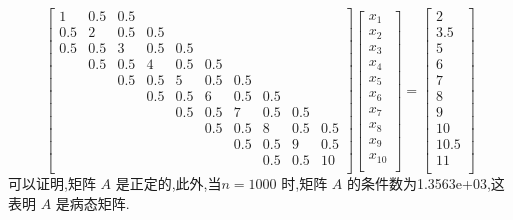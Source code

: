 \documentclass[a4paper]{article}
\numberwithin{equation}{section}
\begin{document}
\begin{equation}
    \begin{bmatrix}
        1   & 0.5 & 0.5 &     &     &     &     &     &     &     \\
        0.5 & 2   & 0.5 & 0.5 &     &     &     &     &     &     \\
        0.5 & 0.5 & 3   & 0.5 & 0.5 &     &     &     &     &     \\
            & 0.5 & 0.5 & 4   & 0.5 & 0.5 &     &     &     &     \\
            &     & 0.5 & 0.5 & 5   & 0.5 & 0.5 &     &     &     \\
            &     &     & 0.5 & 0.5 & 6   & 0.5 & 0.5 &     &     \\
            &     &     &     & 0.5 & 0.5 & 7   & 0.5 & 0.5 &     \\
            &     &     &     &     & 0.5 & 0.5 & 8   & 0.5 & 0.5 \\
            &     &     &     &     &     & 0.5 & 0.5 & 9   & 0.5 \\
            &     &     &     &     &     &     & 0.5 & 0.5 & 10  \\
    \end{bmatrix}
    \begin{bmatrix}
        x_1    \\
        x_2    \\
        x_3    \\
        x_4    \\
        x_5    \\
        x_6    \\
        x_7    \\
        x_8    \\
        x_9    \\
        x_{10} \\
    \end{bmatrix}
    =
    \begin{bmatrix}
        2    \\
        3.5  \\
        5    \\
        6    \\
        7    \\
        8    \\
        9    \\
        10   \\
        10.5 \\
        11   \\
    \end{bmatrix}
\end{equation}
可以证明,矩阵 $A$ 是正定的,此外,当$n=1000$ 时,矩阵 $A$ 的条件数为1.3563e+03,这表明 $A$ 是病态矩阵.
\end{document}
